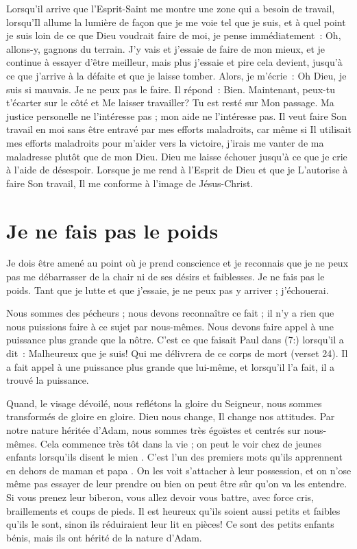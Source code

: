 Lorsqu'il arrive que l'Esprit-Saint me montre une zone qui a besoin de travail,
 lorsqu'Il allume la lumière de façon que je me voie tel que je suis,
 et à quel point je suis loin de ce que Dieu voudrait faire de moi,
 je pense immédiatement~:
 \og Oh, allons-y, gagnons du terrain. \fg{}
 J'y vais et j'essaie de faire de mon mieux,
 et je continue à essayer d'être meilleur,
 mais plus j'essaie et pire cela devient,
 jusqu'à ce que j'arrive à la défaite et que je laisse tomber.
 Alors, je m'écrie~:
 \og Oh Dieu, je suis si mauvais. Je ne peux pas le faire. \fg{}
 Il répond~:
 \og Bien. Maintenant, peux-tu t'écarter sur le côté et Me laisser travailler?
 Tu est resté sur Mon passage. \fg{}
 Ma justice personelle ne l'intéresse pas ;
 mon aide ne l'intéresse pas.
 Il veut faire Son travail en moi sans être entravé
 par mes efforts maladroits,
 car même si Il utilisait mes efforts maladroits
 pour m'aider vers la victoire,
 j'irais me vanter de ma maladresse plutôt que de mon Dieu.
 Dieu me laisse échouer jusqu'à ce que je crie à l'aide de désespoir.
 Lorsque je me rend à l'Esprit de Dieu et que je L'autorise
 à faire Son travail, Il me conforme à l'image de Jésus-Christ.


\section*{Je ne fais pas le poids}

Je dois être amené au point où je prend conscience et
 je reconnais que je ne peux pas me débarrasser de la chair
 ni de ses désirs et faiblesses.
 Je ne fais pas le poids. Tant que je lutte et que j'essaie,
 je ne peux pas y arriver ; j'échouerai.

Nous sommes des pécheurs ; nous devons reconnaître ce fait ;
 il n'y a rien que nous puissions faire à ce sujet par nous-mêmes.
 Nous devons faire appel à une puissance plus grande que la nôtre.
 C'est ce que faisait Paul dans (7:) lorsqu'il a dit~:
 \og Malheureux que je suis! Qui me délivrera de ce corps de mort \fg{}
 (verset 24).
 Il a fait appel à une puissance plus grande que lui-même,
 et lorsqu'il l'a fait, il a trouvé la puissance.

Quand, le visage dévoilé, nous reflétons la gloire du Seigneur,
 nous sommes transformés de gloire en gloire.
 Dieu nous change, Il change nos attitudes.
 Par notre nature héritée d'Adam, nous sommes très égoïstes
 et centrés sur nous-mêmes.
 Cela commence très tôt dans la vie ; on peut le voir chez de jeunes enfants
 lorsqu'ils disent \og le mien \fg{}.
 C'est l'un des premiers mots qu'ils apprennent
 en dehors de \og maman \fg{} et \og papa \fg{}.
 On les voit s'attacher à leur possession, et on n'ose même pas
 essayer de leur prendre ou bien on peut être sûr qu'on va les entendre.
 Si vous prenez leur biberon, vous allez devoir vous battre,
 avec force cris, braillements et coups de pieds.
 Il est heureux qu'ils soient aussi petits et faibles qu'ils le sont,
 sinon ils réduiraient leur lit en pièces!
 Ce sont des petits enfants bénis,
 mais ils ont hérité de la nature d'Adam.

